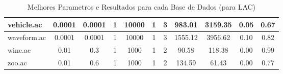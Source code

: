 \begin{table}[htbp]
\begin{tabular}{|l|c|c|c|c|c|c||c|c|c|c|}
		\hline
		vehicle.ac     & 0.0001   & 0.0001      & 1              & 10000               & 1             & 3             & 983.01         & 3159.35        & 0.05           & 0.67           \\
		\hline
		waveform.ac    & 0.0001   & 0.0001      & 1              & 10000               & 1             & 3             & 1555.12        & 3956.62        & 0.10           & 0.82           \\
		\hline
		wine.ac        & 0.01     & 0.3         & 1              & 1000                & 1             & 2             & 90.58          & 118.38         & 0.00           & 0.99           \\
		\hline
		zoo.ac         & 0.01     & 0.6         & 1              & 1000                & 1             & 2             & 134.59         & 61.43          & 0.00           & 0.77           \\
		\hline
		\end{tabular}
	\caption{Melhores Parametros e Resultados para cada Base de Dados (para LAC)}
	\label{tab:best_runs_for_each_db_lac_uc}
\end{table}